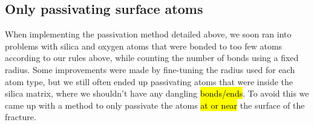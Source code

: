 

\subsection{Only passivating surface atoms}
When implementing the passivation method detailed above, we soon ran into problems with silica and oxygen atoms that were bonded to too few atoms according to our rules above, while counting the number of bonds using a fixed radius. Some improvements were made by fine-tuning the radius used for each atom type, but we still often ended up passivating atoms that were inside the silica matrix, where we shouldn't have any dangling \hl{bonds/ends}. To avoid this we came up with a method to only passivate the atoms \hl{at or near} the surface of the fracture.

